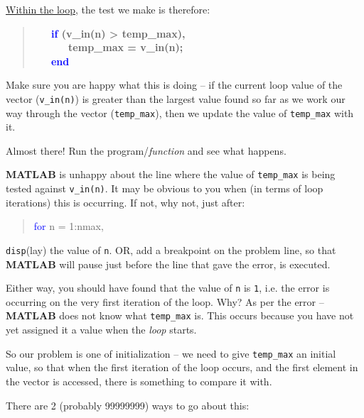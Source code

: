 \documentclass{tufte-book} %
\newenvironment{docspec}{\begin{quotation}\ttfamily\parskip0pt\parindent0pt\ignorespaces}{\end{quotation}}
\newenvironment{docspecbold}{\begin{quotation}\ttfamily\bfseries\parskip0pt\parindent0pt\ignorespaces}{\end{quotation}}
\begin{document}
\vspace{1mm}
\uline{Within the loop}, the test we make is therefore:
\begin{docspecbold}
\ \ \ \textcolor{blue}{if} (v\_in(n) > temp\_max),\\
\ \ \ \ \ \ temp\_max = v\_in(n);\\
\ \ \ \textcolor{blue}{end}
\end{docspecbold}
Make sure you are happy what this is doing -- if the current loop value of the vector (\texttt{v\_in(n)}) is greater than the largest value found so far as we work our way through the vector (\texttt{temp\_max}), then we update the value of \texttt{temp\_max} with it.

Almost there! Run the program/\textit{function} and see what happens.

\textbf{MATLAB} is unhappy about the line where the value of \texttt{temp\_max} is being tested against \texttt{v\_in(n)}. It may be obvious to you when (in terms of loop iterations) this is occurring. If not, why not, just after:

\begin{docspec}
\textcolor{blue}{for} n = 1:nmax,
\end{docspec} 

\noindent \texttt{disp}(lay) the value of \texttt{n}. OR, add a breakpoint on the problem line, so that \textbf{MATLAB} will pause just before the line that gave the error, is executed.

Either way, you should have found that the value of \texttt{n} is \texttt{1}, i.e. the error is occurring on the very first iteration of the loop. Why? As per the error -- \textbf{MATLAB} does not know what \texttt{temp\_max} is. This occurs because you have not yet assigned it a value when the \textit{loop} starts.

So our problem is one of initialization -- we need to give \texttt{temp\_max} an initial value, so that when the first iteration of the loop occurs, and the first element in the vector is accessed, there is something to compare it with.

There are 2 (probably 99999999) ways to go about this:
 
\end{document}
